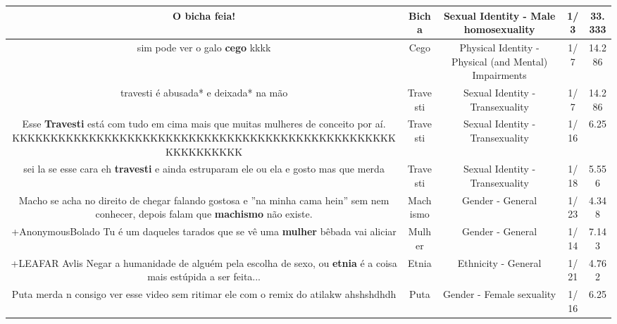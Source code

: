 \documentclass[11pt]{article}
\newlength\mylength
\begin{document}
\begin{center}
\begin{longtable}{|C{.65\mylength}|C{.30\mylength}|C{.12\mylength}|C{.12\mylength}|C{.12\mylength}|}
  \small O \textbf{bicha} feia!\normalsize   & Bicha & Sexual Identity - Male homosexuality & 1/3 & 33.333 \\  \hline
  \small sim pode ver o galo \textbf{cego} kkkk\normalsize   & Cego & Physical Identity - Physical (and Mental) Impairments & 1/7 & 14.286 \\  \hline
  \small travesti é abusada* e deixada* na mão\normalsize   & Travesti & Sexual Identity - Transexuality & 1/7 & 14.286 \\  \hline
  \small Esse \textbf{Travesti} está com tudo em cima mais que muitas mulheres de conceito por aí. KKKKKKKKKKKKKKKKKKKKKKKKKKKKKKKKKKKKKKKKKKKKKKKKKKKKKKKKKKKK\normalsize   & Travesti & Sexual Identity - Transexuality & 1/16 & 6.25 \\  \hline
  \small sei la se esse cara eh \textbf{travesti} e ainda estruparam ele ou ela e gosto mas que merda\normalsize   & Travesti & Sexual Identity - Transexuality & 1/18 & 5.556 \\  \hline
  \small Macho se acha no direito de chegar falando gostosa e ''na minha cama hein'' sem nem conhecer, depois falam que \textbf{machismo} não existe.\normalsize   & Machismo & Gender - General & 1/23 & 4.348 \\  \hline
  \small +AnonymousBolado Tu é um daqueles tarados que se vê uma \textbf{mulher} bêbada vai aliciar\normalsize   & Mulher & Gender - General & 1/14 & 7.143 \\  \hline
  \small +LEAFAR Avlis Negar a humanidade de alguém pela escolha de sexo, ou \textbf{etnia} é a coisa mais estúpida a ser feita...\normalsize   & Etnia & Ethnicity - General & 1/21 & 4.762 \\  \hline
  \small Puta merda n consigo ver esse video sem ritimar ele com o remix do atilakw ahshshdhdh\normalsize   & Puta & Gender - Female sexuality & 1/16 & 6.25 \\  \hline

\end{longtable}
\end{center}
\end{document}
